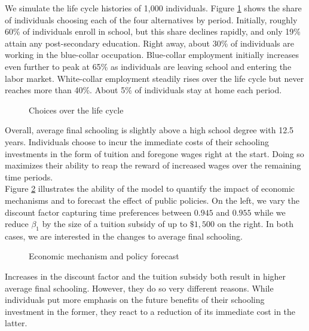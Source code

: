 \noindent We simulate the life cycle histories of 1,000 individuals. Figure \ref{Choices over the life cycle} shows the share of individuals choosing each of the four alternatives by period. Initially, roughly 60\% of individuals enroll in school, but this share declines rapidly, and only 19\% attain any post-secondary education. Right away, about 30\% of individuals are working in the blue-collar occupation.  Blue-collar employment initially increases even further to peak at 65\% as individuals are leaving school and entering the labor market. White-collar employment steadily rises over the life cycle but never reaches more than 40\%. About 5\% of individuals stay at home each period.

\begin{figure}[ht!]\centering
\caption{Choices over the life cycle}\label{Choices over the life cycle}
\end{figure}\FloatBarrier

\noindent Overall, average final schooling is slightly above a high school degree with 12.5 years. Individuals choose to incur the immediate costs of their schooling investments in the form of tuition and foregone wages right at the start. Doing so maximizes their ability to reap the reward of increased wages over the remaining time periods.\\

\noindent Figure \ref{Economic mechanism and policy forecast} illustrates the ability of the model to quantify the impact of economic mechanisms and to forecast the effect of public policies. On the left, we vary the discount factor capturing time preferences between $0.945$ and $0.955$ while we reduce $\beta_1$ by the size of a tuition subsidy of up to $\$1,500$ on the right. In both cases, we are interested in the changes to average final schooling.

\begin{figure}[h!]\centering
\caption{Economic mechanism and policy forecast}\label{Economic mechanism and policy forecast}
\hspace{0.3cm}
\end{figure}\FloatBarrier

\noindent Increases in the discount factor and the tuition subsidy both result in higher average final schooling. However, they do so very different reasons. While individuals put more emphasis on the future benefits of their schooling investment in the former, they react to a reduction of its immediate cost in the latter.
